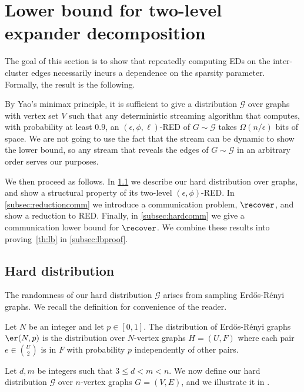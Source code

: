 \section{Lower bound for two-level expander decomposition}
\label{sec:lb}
The goal of this section is to show that repeatedly computing EDs on the inter-cluster edges necessarily incurs a dependence on the sparsity parameter. Formally, the result is the following.

\lb*
\noindent
By Yao's minimax principle, it is sufficient to give a distribution $\mathcal{G}$ over graphs with vertex set $V$ such that any deterministic streaming algorithm that computes, with probability at least $0.9$, an $(\epsilon,\phi,\ell)$-RED of $G \sim \mathcal{G}$  takes $\Omega(n/\epsilon)$ bits of space. We are not going to use the fact that the stream can be dynamic to show the lower bound, so any stream that reveals the edges of $G \sim \mathcal{G}$  in an arbitrary order serves our purposes.

We then proceed as follows. In \cref{subsec:harddistrib} we describe our hard distribution over graphs, and show a structural property of its two-level $(\epsilon,\phi)$-RED. In \cref{subsec:reductioncomm} we introduce a communication problem, $\recover$, and show a reduction to RED. Finally, in \cref{subsec:hardcomm} we give a communication lower bound for $\recover$. We combine these results into proving~\cref{th:lb} in \cref{subsec:lbproof}.


\subsection{Hard distribution}
\label{subsec:harddistrib}
The randomness of our hard distribution $\mathcal{G}$ arises from sampling Erd\H{o}s-R\'{e}nyi graphs. We recall the definition for convenience of the reader.
\begin{definition}\label{def:er}
	Let $N$ be an integer and let $p \in [0,1]$. The distribution of Erd\H{o}s-R\'{e}nyi graphs $\er(N, p)$ is the distribution over $N$-vertex graphs $H=(U,F)$ where each pair $e \in \binom{U}{2}$ is in $F$ with probability $p$ independently of other pairs.
\end{definition}
\noindent
Let $d,m$ be integers such that $3 \le d < m < n$. We now define our hard distribution $\mathcal{G}$ over $n$-vertex  graphs $G=(V, E)$, and we illustrate it in .


